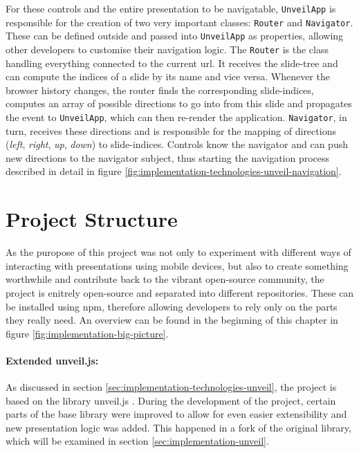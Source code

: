For these controls and the entire presentation to be navigatable, \texttt{Un\-veil\-App} is responsible for the creation of two very important classes: \texttt{Router} and \texttt{Navigator}. These can be defined outside and passed into \texttt{UnveilApp} as properties, allowing other developers to customise their navigation logic.
%
The \texttt{Router} is the class handling everything connected to the current url. It receives the slide-tree and can compute the indices of a slide by its name and vice versa. Whenever the browser history changes, the router finds the corresponding slide-indices, computes an array of possible directions to go into from this slide and propagates the event to \texttt{UnveilApp}, which can then re-render the application.
\texttt{Navigator}, in turn, receives these directions and is responsible for the mapping of directions (\emph{left}, \emph{right}, \emph{up}, \emph{down}) to slide-indices. Controls know the navigator and can push new directions to the navigator subject, thus starting the navigation process described in detail in figure \ref{fig:implementation-technologies-unveil-navigation}.

\section{Project Structure}
\label{sec:implementation-structure}

As the puropose of this project was not only to experiment with different ways of interacting with presentations using mobile devices, but also to create something worthwhile and contribute back to the vibrant open-source community, the project is enitrely open-source and separated into different repositories. These can be installed using npm, therefore allowing developers to rely only on the parts they really need. An overview can be found in the beginning of this chapter in figure \ref{fig:implementation-big-picture}.

\paragraph{Extended unveil.js:} As discussed in section \ref{sec:implementation-technologies-unveil}, the project is based on the library unveil.js \cite{unveil}. During the development of the project, certain parts of the base library were improved to allow for even easier extensibility and new presentation logic was added. This happened in a fork of the original library, which will be examined in section \ref{sec:implementation-unveil}.

